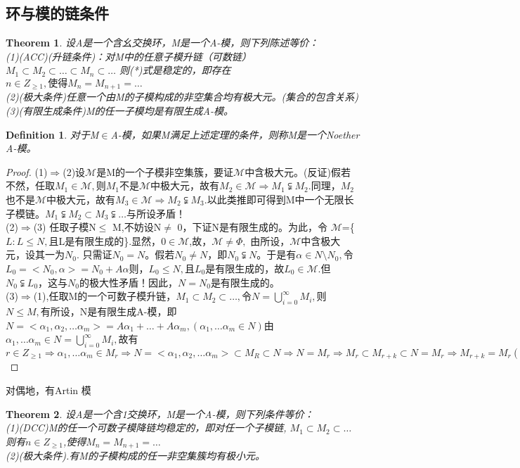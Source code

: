 \documentclass[UTF8]{article}
\newtheorem{thm}{Theorem}[section]
\newtheorem{defn}{Definition}[section]
\begin{document}
\subsection{环与模的链条件}
\begin{thm}
	设A是一个含幺交换环，M是一个A-模，则下列陈述等价：\\
	(1)(ACC)(升链条件)：对M中的任意子模升链（可数链）
	$M_1\subset M_2\subset\ldots\subset M_n\subset\ldots$
	则(*)式是稳定的，即存在$n\in Z_{\geq1},使得M_n=M_{n+1}=\ldots$\\
	(2)(极大条件)任意一个由M的子模构成的非空集合均有极大元。(集合的包含关系)\\
	(3)(有限生成条件)M的任一子模均是有限生成A-模。
\end{thm}
\begin{defn}
	对于M$\in $A-模，如果M满足上述定理的条件，则称M是一个Noether A-模。
\end{defn}
\begin{proof}
	(1)$\Rightarrow$(2)设$\mathscr{M}$是M的一个子模非空集簇，要证$\mathscr{M}$中含极大元。(反证)假若不然，任取$M_1\in \mathscr{M},$则$M_1$不是$\mathscr{M}$中极大元，故有$M_2\in \mathscr{M}\Rightarrow M_1\subsetneqq M_2$.同理，$M_2$也不是$\mathscr{M}$中极大元，故有$M_3\in \mathscr{M}\Rightarrow M_2\subsetneqq M_3$.以此类推即可得到M中一个无限长子模链。$M_1\subsetneqq M_2\subset M_3\subsetneqq\ldots$与所设矛盾！\\
	(2)$\Rightarrow$(3) 任取子模N$\leq$ M,不妨设N$\neq$ 0，下证N是有限生成的。为此，令
	$\mathscr{M}$=\{$L:L\leq N,$且L是有限生成的\}.显然，$0\in \mathscr{M}$,故，$\mathscr{M}\neq \Phi,$ 由所设，$\mathscr{M}$中含极大元，设其一为$N_0$. 只需证$N_0=N$。假若$N_0\neq N$，即$N_0\subsetneqq N$。于是有$\alpha\in N\setminus N_0,$令$L_0=<N_0,\alpha>=N_0+A\alpha$则，$L_0\leq N,$且$L_0$是有限生成的，故$L_0\in \mathscr{M}$.但$N_0\subsetneqq L_0$，这与$N_0$的极大性矛盾！因此，$N=N_0$是有限生成的。\\
	(3)$\Rightarrow$(1),任取M的一个可数子模升链，$M_1\subset M_2\subset\ldots,$令$N=\bigcup\limits_{i=0}^{\infty}{M_i},$则$N\leq M,$有所设，N是有限生成A-模，即$N=<\alpha_1,\alpha_2,\ldots\alpha_m>=A\alpha_1+\ldots+A\alpha_m,(\alpha_1,\ldots\alpha_m\in N)
	$由$\alpha_1,\ldots\alpha_m\in N=\bigcup\limits_{i=0}^\infty{M_i},$故有$r\in Z_{\geq1}\Rightarrow \alpha_1,\ldots\alpha_m\in M_r\Rightarrow N=<\alpha_1,\alpha_2,\ldots\alpha_m>\subset M_R\subset N\Rightarrow N=M_r\Rightarrow M_r\subset M_{r+k}\subset N=M_r\Rightarrow M_{r+k}=M_r(\forall k\in Z_{\geq0})$
\end{proof}
对偶地，有Artin 模
\begin{thm}
	设A是一个含1交换环，M是一个A-模，则下列条件等价：\\
	(1)(DCC)M的任一个可数子模降链均稳定的，即对任一个子模链,
	$M_1\subset M_2\subset\ldots $则有$ n \in Z_{\geq1}$,使得$M_n=M_{n+1}=\ldots $\\
	(2)(极大条件).有M的子模构成的任一非空集簇均有极小元。
\end{thm}
\end{document}
